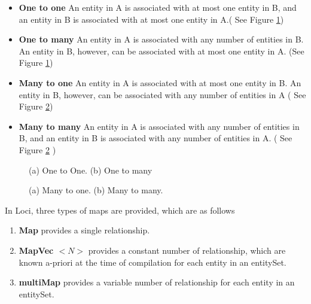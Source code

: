 \begin{itemize}
\item {\bf One to one} An entity in A is associated with at most one 
entity in B, and an entity in B is associated with at most one entity in A.(
See Figure \ref{FigMap1})
%
\item {\bf One to many} An entity in A is associated with any number of 
entities in B. An entity in B, however, can be associated with at most one
entity in A. (See Figure \ref{FigMap1})
%
\item {\bf Many to one} An entity in A is associated with at most one
entity in B. An entity in B, however, can be associated with any number of
entities in A ( See Figure \ref{FigMap2})
%
\item {\bf Many to many} An entity in A is associated with any number of
entities in B, and an entity in B is associated with any number of 
entities in A. ( See Figure \ref{FigMap2} )
\end{itemize}

\begin{figure}[h]
\vspace{2.0in}\caption {(a) One to One. (b) One to many}
\label{FigMap1}
\end{figure}


\begin{figure}[h]
\vspace{2.1in}\caption { (a) Many to one. (b) Many to many.}
\label{FigMap2}
\end{figure}

\par In Loci, three types of maps are provided, which are as follows

\begin{enumerate}
\item {\bf Map}  provides a single relationship.
\item {\bf MapVec $<N>$} provides a constant number of relationship, which are 
known a-priori at the time of compilation for each entity in an entitySet.
\item {\bf multiMap} provides a variable number of relationship for each 
entity in an entitySet.
\end{enumerate}


